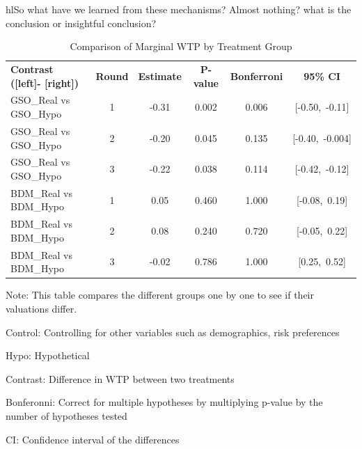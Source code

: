\documentclass[12pt]{article}
\begin{document}
hl{So what have we learned from these mechanisms? Almost nothing? what is the conclusion or insightful conclusion?}




\begin{table}[H]\centering
\footnotesize
\caption{Comparison of Marginal WTP by Treatment Group}
\label{tab: Regression by Round}
\begin{tabular}{lccccc}
\textbf{Contrast ([left]- [right])} & \textbf{Round} & \textbf{Estimate} & \textbf{P-value} & \textbf{Bonferroni} & \textbf{95\% CI} \\
GSO\_Real vs GSO\_Hypo & 1 & -0.31 & 0.002 & 0.006 & [-0.50,\ -0.11] \\
GSO\_Real vs GSO\_Hypo & 2 & -0.20 & 0.045 & 0.135 & [-0.40,\ -0.004] \\
GSO\_Real vs GSO\_Hypo & 3 & -0.22 & 0.038 & 0.114 & [-0.42,\ -0.12] \\
BDM\_Real vs BDM\_Hypo & 1 & 0.05 & 0.460 & 1.000 & [-0.08,\ 0.19] \\
BDM\_Real vs BDM\_Hypo & 2 & 0.08 & 0.240 & 0.720 & [-0.05,\ 0.22] \\
BDM\_Real vs BDM\_Hypo & 3 & -0.02 & 0.786 & 1.000 & [0.25,\ 0.52] \\
\end{tabular}
\begin{tablenotes}
            \footnotesize
            \item Note: This table compares the different groups one by one to see if their valuations differ.
            \item Control: Controlling for other variables such as demographics, risk preferences
            \item Hypo: Hypothetical
            \item Contrast: Difference in WTP between two treatments
            \item Bonferonni: Correct for multiple hypotheses by multiplying p-value by the number of hypotheses tested
            \item CI: Confidence interval of the differences
\end{tablenotes}
\end{table}










\end{document}
